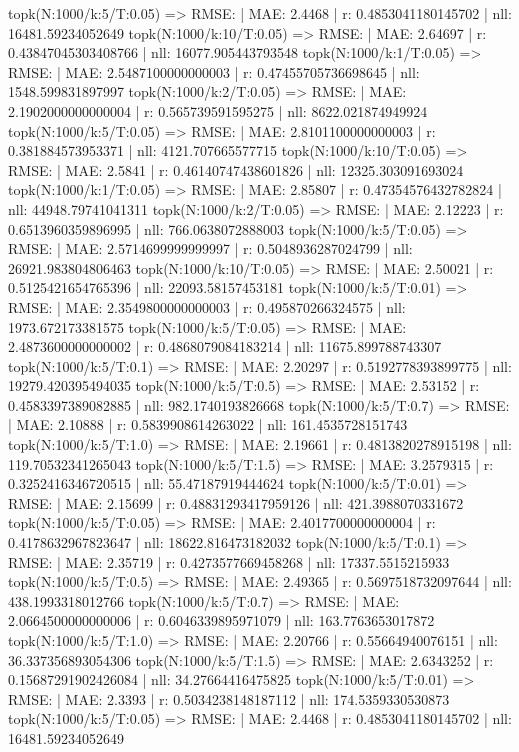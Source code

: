 topk(N:1000/k:5/T:0.05) => RMSE: | MAE: 2.4468 | r: 0.4853041180145702 | nll: 16481.59234052649
topk(N:1000/k:10/T:0.05) => RMSE: | MAE: 2.64697 | r: 0.43847045303408766 | nll: 16077.905443793548
topk(N:1000/k:1/T:0.05) => RMSE: | MAE: 2.5487100000000003 | r: 0.47455705736698645 | nll: 1548.599831897997
topk(N:1000/k:2/T:0.05) => RMSE: | MAE: 2.1902000000000004 | r: 0.565739591595275 | nll: 8622.021874949924
topk(N:1000/k:5/T:0.05) => RMSE: | MAE: 2.8101100000000003 | r: 0.381884573953371 | nll: 4121.707665577715
topk(N:1000/k:10/T:0.05) => RMSE: | MAE: 2.5841 | r: 0.46140747438601826 | nll: 12325.303091693024
topk(N:1000/k:1/T:0.05) => RMSE: | MAE: 2.85807 | r: 0.47354576432782824 | nll: 44948.79741041311
topk(N:1000/k:2/T:0.05) => RMSE: | MAE: 2.12223 | r: 0.6513960359896995 | nll: 766.0638072888003
topk(N:1000/k:5/T:0.05) => RMSE: | MAE: 2.5714699999999997 | r: 0.5048936287024799 | nll: 26921.983804806463
topk(N:1000/k:10/T:0.05) => RMSE: | MAE: 2.50021 | r: 0.5125421654765396 | nll: 22093.58157453181
topk(N:1000/k:5/T:0.01) => RMSE: | MAE: 2.3549800000000003 | r: 0.495870266324575 | nll: 1973.672173381575
topk(N:1000/k:5/T:0.05) => RMSE: | MAE: 2.4873600000000002 | r: 0.4868079084183214 | nll: 11675.899788743307
topk(N:1000/k:5/T:0.1) => RMSE: | MAE: 2.20297 | r: 0.5192778393899775 | nll: 19279.420395494035
topk(N:1000/k:5/T:0.5) => RMSE: | MAE: 2.53152 | r: 0.4583397389082885 | nll: 982.1740193826668
topk(N:1000/k:5/T:0.7) => RMSE: | MAE: 2.10888 | r: 0.5839908614263022 | nll: 161.4535728151743
topk(N:1000/k:5/T:1.0) => RMSE: | MAE: 2.19661 | r: 0.4813820278915198 | nll: 119.70532341265043
topk(N:1000/k:5/T:1.5) => RMSE: | MAE: 3.2579315 | r: 0.3252416346720515 | nll: 55.47187919444624
topk(N:1000/k:5/T:0.01) => RMSE: | MAE: 2.15699 | r: 0.48831293417959126 | nll: 421.3988070331672
topk(N:1000/k:5/T:0.05) => RMSE: | MAE: 2.4017700000000004 | r: 0.4178632967823647 | nll: 18622.816473182032
topk(N:1000/k:5/T:0.1) => RMSE: | MAE: 2.35719 | r: 0.4273577669458268 | nll: 17337.5515215933
topk(N:1000/k:5/T:0.5) => RMSE: | MAE: 2.49365 | r: 0.5697518732097644 | nll: 438.1993318012766
topk(N:1000/k:5/T:0.7) => RMSE: | MAE: 2.0664500000000006 | r: 0.6046339895971079 | nll: 163.7763653017872
topk(N:1000/k:5/T:1.0) => RMSE: | MAE: 2.20766 | r: 0.55664940076151 | nll: 36.337356893054306
topk(N:1000/k:5/T:1.5) => RMSE: | MAE: 2.6343252 | r: 0.15687291902426084 | nll: 34.27664416475825
topk(N:1000/k:5/T:0.01) => RMSE: | MAE: 2.3393 | r: 0.5034238148187112 | nll: 174.5359330530873
topk(N:1000/k:5/T:0.05) => RMSE: | MAE: 2.4468 | r: 0.4853041180145702 | nll: 16481.59234052649
